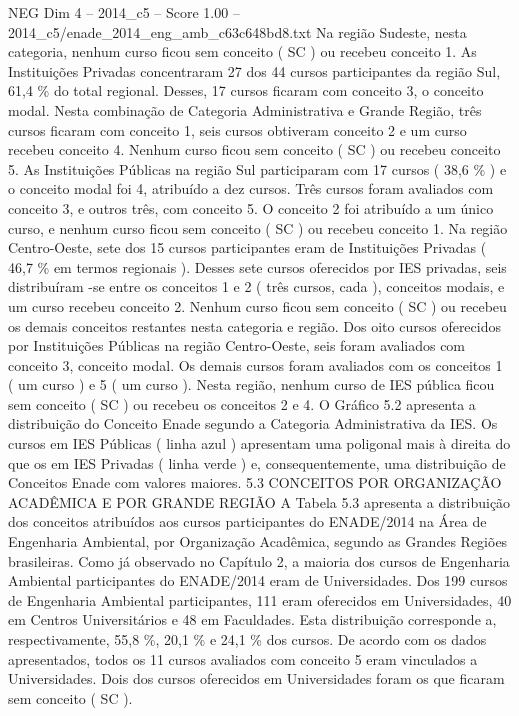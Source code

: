 \begin{textsample}{NEG Dim 4 – 2014\_c5 – Score 1.00 – 2014\_c5/enade\_2014\_eng\_amb\_c63c648bd8.txt}
Na região Sudeste, nesta categoria, nenhum curso ficou sem conceito ( SC ) ou recebeu conceito 1.
As Instituições Privadas concentraram 27 dos 44 cursos participantes da região Sul, 61,4 \% do total regional.
Desses, 17 cursos ficaram com conceito 3, o conceito modal.
Nesta combinação de Categoria Administrativa e Grande Região, três cursos ficaram com conceito 1, seis cursos obtiveram conceito 2 e um curso recebeu conceito 4.
Nenhum curso ficou sem conceito ( SC ) ou recebeu conceito 5.
As Instituições Públicas na região Sul participaram com 17 cursos ( 38,6 \% ) e o conceito modal foi 4, atribuído a dez cursos.
Três cursos foram avaliados com conceito 3, e outros três, com conceito 5.
O conceito 2 foi atribuído a um único curso, e nenhum curso ficou sem conceito ( SC ) ou recebeu conceito 1.
Na região Centro-Oeste, sete dos 15 cursos participantes eram de Instituições Privadas ( 46,7 \% em termos regionais ).
Desses sete cursos oferecidos por IES privadas, seis distribuíram -se entre os conceitos 1 e 2 ( três cursos, cada ), conceitos modais, e um curso recebeu conceito 2.
Nenhum curso ficou sem conceito ( SC ) ou recebeu os demais conceitos restantes nesta categoria e região.
Dos oito cursos oferecidos por Instituições Públicas na região Centro-Oeste, seis foram avaliados com conceito 3, conceito modal.
Os demais cursos foram avaliados com os conceitos 1 ( um curso ) e 5 ( um curso ).
Nesta região, nenhum curso de IES pública ficou sem conceito ( SC ) ou recebeu os conceitos 2 e 4.
O Gráfico 5.2 apresenta a distribuição do Conceito Enade segundo a Categoria Administrativa da IES.
Os cursos em IES Públicas ( linha azul ) apresentam uma poligonal mais à direita do que os em IES Privadas ( linha verde ) e, consequentemente, uma distribuição de Conceitos Enade com valores maiores. 5.3 CONCEITOS POR ORGANIZAÇÃO ACADÊMICA E POR GRANDE REGIÃO A Tabela 5.3 apresenta a distribuição dos conceitos atribuídos aos cursos participantes do ENADE/2014 na Área de Engenharia Ambiental, por Organização Acadêmica, segundo as Grandes Regiões brasileiras.
Como já observado no Capítulo 2, a maioria dos cursos de Engenharia Ambiental participantes do ENADE/2014 eram de Universidades.
Dos 199 cursos de Engenharia Ambiental participantes, 111 eram oferecidos em Universidades, 40 em Centros Universitários e 48 em Faculdades.
Esta distribuição corresponde a, respectivamente, 55,8 \%, 20,1 \% e 24,1 \% dos cursos.
De acordo com os dados apresentados, todos os 11 cursos avaliados com conceito 5 eram vinculados a Universidades.
Dois dos cursos oferecidos em Universidades foram os que ficaram sem conceito ( SC ).

\end{textsample}
